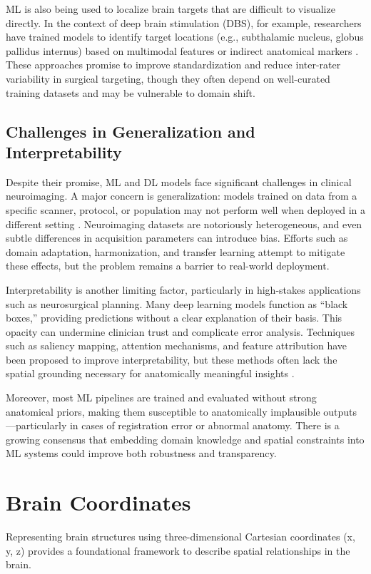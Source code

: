 ML is also being used to localize brain targets that are difficult to visualize directly. In the context of deep brain stimulation (DBS), for example, researchers have trained models to identify target locations (e.g., subthalamic nucleus, globus pallidus internus) based on multimodal features or indirect anatomical markers \cite{yang2020deep}. These approaches promise to improve standardization and reduce inter-rater variability in surgical targeting, though they often depend on well-curated training datasets and may be vulnerable to domain shift.

\subsection{Challenges in Generalization and Interpretability}

Despite their promise, ML and DL models face significant challenges in clinical neuroimaging. A major concern is generalization: models trained on data from a specific scanner, protocol, or population may not perform well when deployed in a different setting \cite{zech2018variable}. Neuroimaging datasets are notoriously heterogeneous, and even subtle differences in acquisition parameters can introduce bias. Efforts such as domain adaptation, harmonization, and transfer learning attempt to mitigate these effects, but the problem remains a barrier to real-world deployment.

Interpretability is another limiting factor, particularly in high-stakes applications such as neurosurgical planning. Many deep learning models function as ``black boxes,'' providing predictions without a clear explanation of their basis. This opacity can undermine clinician trust and complicate error analysis. Techniques such as saliency mapping, attention mechanisms, and feature attribution have been proposed to improve interpretability, but these methods often lack the spatial grounding necessary for anatomically meaningful insights \cite{holzinger2019causability}.

Moreover, most ML pipelines are trained and evaluated without strong anatomical priors, making them susceptible to anatomically implausible outputs—particularly in cases of registration error or abnormal anatomy. There is a growing consensus that embedding domain knowledge and spatial constraints into ML systems could improve both robustness and transparency.



\section{Brain Coordinates}
Representing brain structures using three-dimensional Cartesian coordinates (x, y, z) provides a foundational framework to describe spatial relationships in the brain. 

